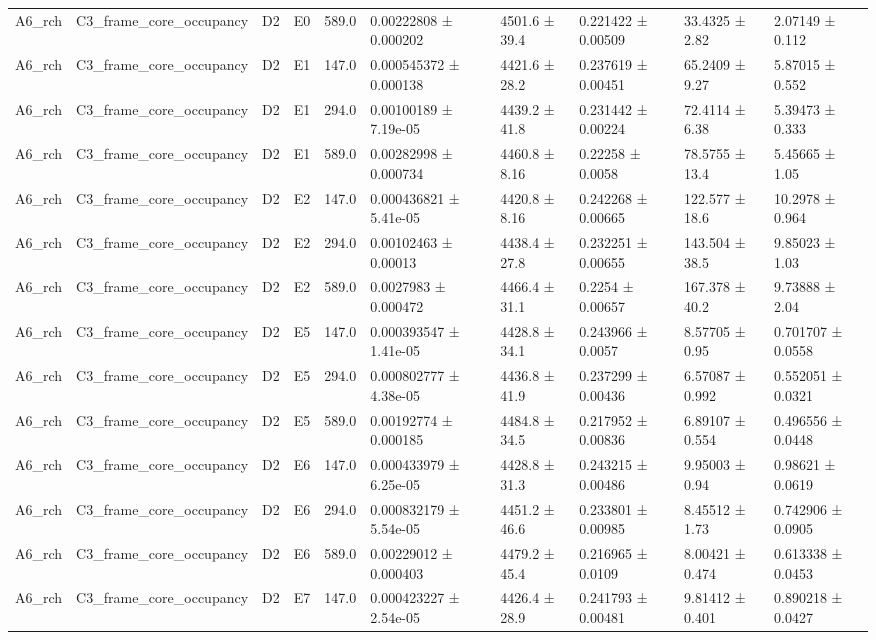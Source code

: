 \begin{table}
\begin{tabular}{llllllllll}
A6\_rch & C3\_frame\_core\_occupancy & D2 & E0 & 589.0 & 0.00222808 ± 0.000202 & 4501.6 ± 39.4 & 0.221422 ± 0.00509 & 33.4325 ± 2.82 & 2.07149 ± 0.112 \\
A6\_rch & C3\_frame\_core\_occupancy & D2 & E1 & 147.0 & 0.000545372 ± 0.000138 & 4421.6 ± 28.2 & 0.237619 ± 0.00451 & 65.2409 ± 9.27 & 5.87015 ± 0.552 \\
A6\_rch & C3\_frame\_core\_occupancy & D2 & E1 & 294.0 & 0.00100189 ± 7.19e-05 & 4439.2 ± 41.8 & 0.231442 ± 0.00224 & 72.4114 ± 6.38 & 5.39473 ± 0.333 \\
A6\_rch & C3\_frame\_core\_occupancy & D2 & E1 & 589.0 & 0.00282998 ± 0.000734 & 4460.8 ± 8.16 & 0.22258 ± 0.0058 & 78.5755 ± 13.4 & 5.45665 ± 1.05 \\
A6\_rch & C3\_frame\_core\_occupancy & D2 & E2 & 147.0 & 0.000436821 ± 5.41e-05 & 4420.8 ± 8.16 & 0.242268 ± 0.00665 & 122.577 ± 18.6 & 10.2978 ± 0.964 \\
A6\_rch & C3\_frame\_core\_occupancy & D2 & E2 & 294.0 & 0.00102463 ± 0.00013 & 4438.4 ± 27.8 & 0.232251 ± 0.00655 & 143.504 ± 38.5 & 9.85023 ± 1.03 \\
A6\_rch & C3\_frame\_core\_occupancy & D2 & E2 & 589.0 & 0.0027983 ± 0.000472 & 4466.4 ± 31.1 & 0.2254 ± 0.00657 & 167.378 ± 40.2 & 9.73888 ± 2.04 \\
A6\_rch & C3\_frame\_core\_occupancy & D2 & E5 & 147.0 & 0.000393547 ± 1.41e-05 & 4428.8 ± 34.1 & 0.243966 ± 0.0057 & 8.57705 ± 0.95 & 0.701707 ± 0.0558 \\
A6\_rch & C3\_frame\_core\_occupancy & D2 & E5 & 294.0 & 0.000802777 ± 4.38e-05 & 4436.8 ± 41.9 & 0.237299 ± 0.00436 & 6.57087 ± 0.992 & 0.552051 ± 0.0321 \\
A6\_rch & C3\_frame\_core\_occupancy & D2 & E5 & 589.0 & 0.00192774 ± 0.000185 & 4484.8 ± 34.5 & 0.217952 ± 0.00836 & 6.89107 ± 0.554 & 0.496556 ± 0.0448 \\
A6\_rch & C3\_frame\_core\_occupancy & D2 & E6 & 147.0 & 0.000433979 ± 6.25e-05 & 4428.8 ± 31.3 & 0.243215 ± 0.00486 & 9.95003 ± 0.94 & 0.98621 ± 0.0619 \\
A6\_rch & C3\_frame\_core\_occupancy & D2 & E6 & 294.0 & 0.000832179 ± 5.54e-05 & 4451.2 ± 46.6 & 0.233801 ± 0.00985 & 8.45512 ± 1.73 & 0.742906 ± 0.0905 \\
A6\_rch & C3\_frame\_core\_occupancy & D2 & E6 & 589.0 & 0.00229012 ± 0.000403 & 4479.2 ± 45.4 & 0.216965 ± 0.0109 & 8.00421 ± 0.474 & 0.613338 ± 0.0453 \\
A6\_rch & C3\_frame\_core\_occupancy & D2 & E7 & 147.0 & 0.000423227 ± 2.54e-05 & 4426.4 ± 28.9 & 0.241793 ± 0.00481 & 9.81412 ± 0.401 & 0.890218 ± 0.0427 \\

\end{tabular}
\end{table}
